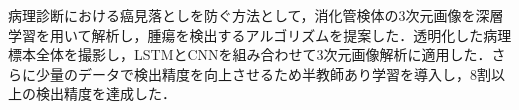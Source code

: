 病理診断における癌見落としを防ぐ方法として，消化管検体の3次元画像を深層学習を用いて解析し，腫瘍を検出するアルゴリズムを提案した．透明化した病理標本全体を撮影し，LSTMとCNNを組み合わせて3次元画像解析に適用した．さらに少量のデータで検出精度を向上させるため半教師あり学習を導入し，8割以上の検出精度を達成した．